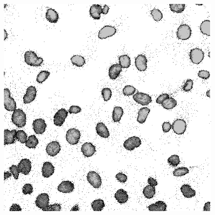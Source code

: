\documentclass[a4paper]{article}
\begin{document}
\begin{figure}[p]
\begin{minipage}[b]{0.32\textwidth}
\label{fig:gm3}
\end{minipage}%
\begin{minipage}[b]{0.32\textwidth}
\centering
\includegraphics[width=1\textwidth]{gmm4}
\label{fig:gm4}
\end{minipage}%
\end{figure}
\end{document}
